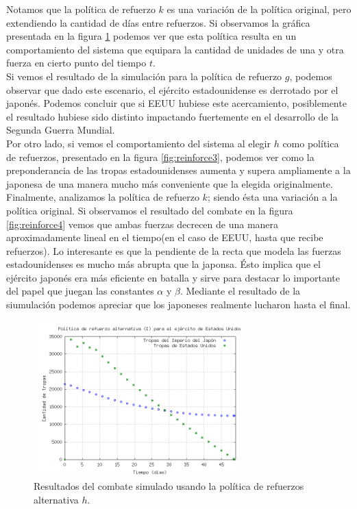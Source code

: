 \documentclass{sig-alternate}
\begin{document}
Notamos que la política de refuerzo $k$ es una variación de la política original, pero extendiendo la cantidad de días entre refuerzos.
Si observamos la gráfica presentada en la figura \ref{fig:reinforce2} podemos ver que esta política resulta en un comportamiento del sistema
que equipara la cantidad de unidades de una y otra fuerza en cierto punto del tiempo $t$.\\
Si vemos el resultado de la simulación para la política de refuerzo $g$, podemos observar que dado este escenario, el ejército estadounidense es derrotado por el japonés. Podemos 
concluir que si EEUU hubiese este acercamiento, posiblemente el resultado hubiese sido distinto impactando fuertemente en el desarrollo de la Segunda Guerra Mundial.\\
Por otro lado, si vemos el comportamiento del sistema al elegir $h$ como política de refuerzos, presentado en la figura \ref{fig:reinforce3}, 
podemos ver como la preponderancia de las tropas estadounidenses aumenta y supera ampliamente a la japonesa de una manera mucho más conveniente que la elegida originalmente.\\
Finalmente, analizamos la política de refuerzo $k$; siendo ésta una variación a la política original. Si observamos el resultado del combate en la figura \ref{fig:reinforce4}
vemos que ambas fuerzas decrecen de una manera aproximadamente lineal en el tiempo(en el caso de EEUU, hasta que recibe refuerzos). Lo interesante es que la pendiente de la recta
que modela las fuerzas estadounidenses es mucho más abrupta que la japonsa. Ésto implica que el ejército japonés era más eficiente en batalla y sirve para destacar lo
importante del papel que juegan las constantes $\alpha$ y $\beta$. Mediante el resultado de la siumulación podemos apreciar que los japoneses realmente lucharon hasta el final.

\begin{figure}[h]
\begin{center}
\includegraphics[width=8cm]{reinforce2.png}
\caption{\label{fig:reinforce2}Resultados del combate simulado usando la política de refuerzos alternativa $h$.}
\end{center}
\end{figure}
\end{document}
